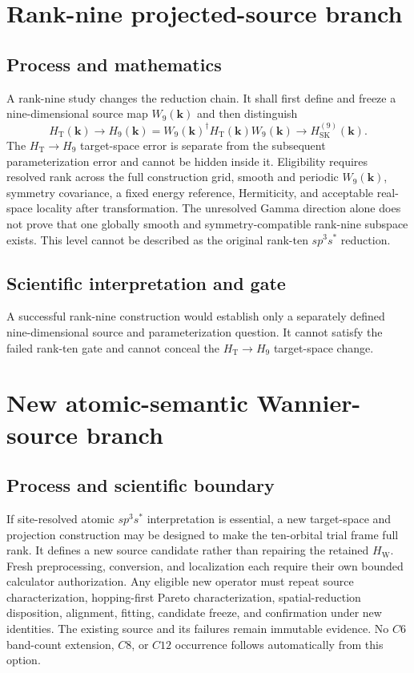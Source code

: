 \documentclass[11pt]{report}
\begin{document}
\chapter{Rank-nine projected-source branch}

\section{Process and mathematics}

A rank-nine study changes the reduction chain.  It shall first define and freeze a
nine-dimensional source map $W_9(\mathbf{k})$ and then distinguish
\begin{equation}
 H_{\mathrm{T}}(\mathbf{k})
 \longrightarrow
 H_9(\mathbf{k})=W_9(\mathbf{k})^{\dagger}
 H_{\mathrm{T}}(\mathbf{k})W_9(\mathbf{k})
 \longrightarrow H_{\mathrm{SK}}^{(9)}(\mathbf{k}).
\end{equation}
The $H_{\mathrm{T}}\rightarrow H_9$ target-space error is separate from the subsequent
parameterization error and cannot be hidden inside it.  Eligibility requires resolved
rank across the full construction grid, smooth and periodic $W_9(\mathbf{k})$, symmetry
covariance, a fixed energy reference, Hermiticity, and acceptable real-space locality
after transformation.  The unresolved Gamma direction alone does not prove that one
globally smooth and symmetry-compatible rank-nine subspace exists.  This level cannot
be described as the original rank-ten $sp^3s^*$ reduction.

\section{Scientific interpretation and gate}

A successful rank-nine construction would establish only a separately defined
nine-dimensional source and parameterization question.  It cannot satisfy the failed
rank-ten gate and cannot conceal the $H_{\mathrm{T}}\rightarrow H_9$ target-space
change.

\chapter{New atomic-semantic Wannier-source branch}

\section{Process and scientific boundary}

If site-resolved atomic $sp^3s^*$ interpretation is essential, a new target-space and
projection construction may be designed to make the ten-orbital trial frame full rank.
It defines a new source candidate rather than repairing the retained $H_{\mathrm{W}}$.
Fresh preprocessing, conversion, and localization each require their own bounded
calculator authorization.  Any eligible new operator must repeat source
characterization, hopping-first Pareto characterization, spatial-reduction disposition,
alignment, fitting, candidate freeze, and confirmation under new identities.  The
existing source and its failures remain immutable evidence.  No $C6$ band-count
extension, $C8$, or $C12$ occurrence follows automatically from this option.
\end{document}
